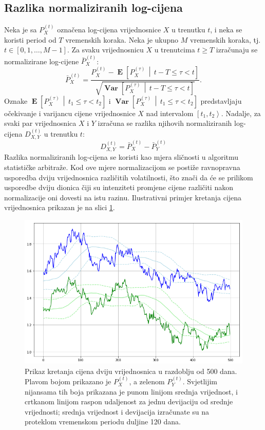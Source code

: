 \documentclass[lmodern, utf8, diplomski, numeric]{fer}
\newcommand{\Efromto}[2]{\operatorname{\mathbf{E}}\left[#1\, \middle\vert\, #2\right]}
\newcommand{\Varfromto}[2]{\operatorname{\mathbf{Var}}\left[#1\, \middle\vert\, #2\right]}
\newcommand{\norm}[1]{\bar{#1}}
\begin{document}
  \subsection{Razlika normaliziranih log-cijena}
  Neka je sa $P_X^{\left(t\right)}$ označena log-cijena vrijednosnice $X$ u trenutku $t$, i neka se koristi period od $T$ vremenskih koraka.
  Neka je ukupno $M$ vremenskih koraka, tj. $t \in \left[0, 1, \ldots, M - 1\right]$.
  Za svaku vrijednosnicu $X$ u trenutcima $t \ge T$ izračunaju se normalizirane log-cijene $\norm{P}_X^{\left(t\right)}$:
  \begin{equation}
  \norm{P}_X^{\left(t\right)} = \frac{P_X^{\left(t\right)} - \Efromto{P_X^{(\tau)}}{t-T \le \tau < t}}{\sqrt{\Varfromto{P_X^{(\tau)}}{t-T \le \tau < t}}}.
  \end{equation}
  Oznake $\Efromto{P_X^{(\tau)}}{t_1 \le \tau < t_2}$ i $\Varfromto{P_X^{(\tau)}}{t_1 \le \tau < t_2}$ predstavljaju očekivanje i varijancu cijene vrijednosnice $X$ nad intervalom $\left[t_1, t_2\right>$.
  Nadalje, za svaki par vrijednosnica $X$ i $Y$ izračuna se razlika njihovih normaliziranih log-cijena $D_{X,Y}^{\left(t\right)}$ u trenutku $t$:
  \begin{equation}
  D_{X,Y}^{\left(t\right)} = \norm{P}_X^{\left(t\right)} - \norm{P}_Y^{\left(t\right)}
  \end{equation}
  Razlika normaliziranih log-cijena se koristi kao mjera sličnosti u algoritmu statističke arbitraže.
  Kod ove mjere normalizacijom se postiže ravnopravna usporedba dviju vrijednosnica različitih volatilnosti, što znači da će se prilikom usporedbe dviju dionica čiji su intenziteti promjene cijene različiti nakon normalizacije oni dovesti na istu razinu.
  Ilustrativni primjer kretanja cijena vrijednosnica prikazan je na slici \ref{fig:ab-prices}.
  
  \begin{figure}[p]
    \centering
    \includegraphics[width=1.0\linewidth]{graphics/ab-prices.png}
    \caption{
      Prikaz kretanja cijena dviju vrijednosnica u razdoblju od 500 dana.
      Plavom bojom prikazano je $P_X^{(t)}$, a zelenom $P_Y^{(t)}$.
      Svjetlijim nijansama tih boja prikazana je punom linijom srednja vrijednost, i crtkanom linijom raspon udaljenost za jednu devijaciju od srednje vrijednosti; srednja vrijednost i devijacija izračunate su na proteklom vremenskom periodu duljine 120 dana.
    }
    \label{fig:ab-prices}
  \end{figure}
\end{document}
